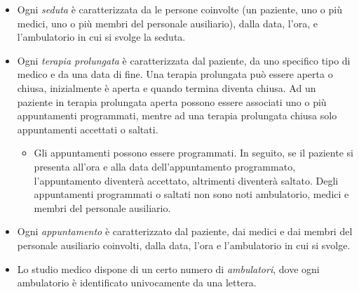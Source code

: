 \documentclass[11pt]{article}
\begin{document}
\begin{itemize}
\begin{itemize}
    \end{itemize}
    \item Ogni \emph{seduta} è caratterizzata da le persone coinvolte (un paziente, uno o più medici, uno o più membri del personale ausiliario), dalla data, l’ora, e l’ambulatorio in cui si svolge la seduta.
    \item Ogni \emph{terapia prolungata} è caratterizzata dal paziente, da uno specifico tipo di medico e da una data di fine. Una terapia prolungata può essere aperta o chiusa, inizialmente è aperta e quando termina diventa chiusa. Ad un paziente in terapia prolungata aperta possono essere associati uno o più appuntamenti programmati, mentre ad una terapia prolungata chiusa solo appuntamenti accettati o saltati.
    \begin{itemize}
        \item Gli appuntamenti possono essere programmati. In seguito, se il paziente si presenta all’ora e alla data dell’appuntamento programmato, l’appuntamento diventerà accettato, altrimenti diventerà saltato. Degli appuntamenti programmati o saltati non sono noti ambulatorio, medici e membri del personale ausiliario.
    \end{itemize}
    \item Ogni \emph{appuntamento} è caratterizzato dal paziente, dai medici e dai membri del personale ausiliario coinvolti, dalla data, l’ora e l’ambulatorio in cui si svolge.
    \item Lo studio medico dispone di un certo numero di \emph{ambulatori}, dove ogni ambulatorio è identificato univocamente da una lettera.
\end{itemize}
\end{document}

